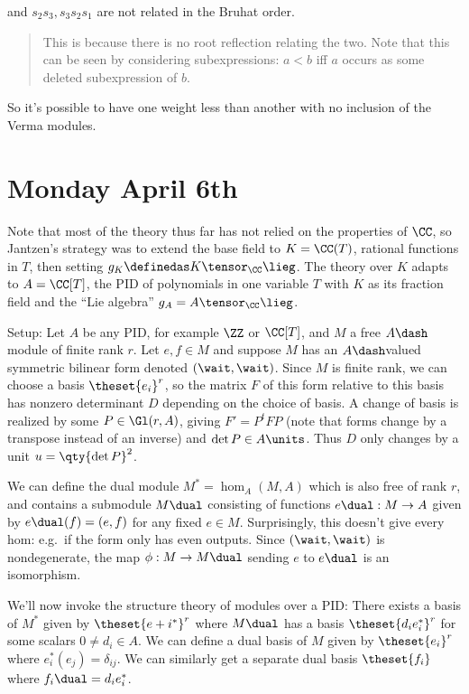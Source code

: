 and \(s_2 s_3, s_3 s_2 s_1\) are not related in the Bruhat order.

\begin{quote}
This is because there is no root reflection relating the two. Note that
this can be seen by considering subexpressions: \(a < b\) iff \(a\)
occurs as some deleted subexpression of \(b\).
\end{quote}

So it's possible to have one weight less than another with no inclusion
of the Verma modules.

\hypertarget{monday-april-6th}{%
\section{Monday April 6th}\label{monday-april-6th}}

Note that most of the theory thus far has not relied on the properties
of \(\CC\), so Jantzen's strategy was to extend the base field to
\(K = \CC(T)\), rational functions in \(T\), then setting
\(g_K \definedas K \tensor_\CC \lieg\). The theory over \(K\) adapts to
\(A = \CC[T]\), the PID of polynomials in one variable \(T\) with \(K\)
as its fraction field and the ``Lie algebra''
\(g_A = A \tensor_\CC \lieg\).

Setup: Let \(A\) be any PID, for example \(\ZZ\) or \(\CC[T]\), and
\(M\) a free \(A\dash\)module of finite rank \(r\). Let \(e, f\in M\)
and suppose \(M\) has an \(A\dash\)valued symmetric bilinear form
denoted \((\wait, \wait)\). Since \(M\) is finite rank, we can choose a
basis \(\theset{e_i}^r\), so the matrix \(F\) of this form relative to
this basis has nonzero determinant \(D\) depending on the choice of
basis. A change of basis is realized by some \(P \in \Gl(r, A)\), giving
\(F' = P^t F P\) (note that forms change by a transpose instead of an
inverse) and \(\det P \in A\units\). Thus \(D\) only changes by a unit
\(u = \qty{\det P}^2\).

We can define the dual module \(M^* = \hom_A(M, A)\) which is also free
of rank \(r\), and contains a submodule \(M\dual\) consisting of
functions \(e\dual: M \to A\) given by \(e\dual(f) = (e, f)\) for any
fixed \(e\in M\). Surprisingly, this doesn't give every hom: e.g.~if the
form only has even outputs. Since \((\wait, \wait)\) is nondegenerate,
the map \(\phi: M\to M\dual\) sending \(e\) to \(e\dual\) is an
isomorphism.

We'll now invoke the structure theory of modules over a PID: There
exists a basis of \(M^*\) given by \(\theset{e+i^*}^r\) where \(M\dual\)
has a basis \(\theset{d_i e_i^*}^r\) for some scalars
\(0\neq d_i \in A\). We can define a dual basis of \(M\) given by
\(\theset{e_i}^r\) where \(e_i^*(e_j) = \delta_{ij}\). We can similarly
get a separate dual basis \(\theset{f_i}\) where
\(f_i\dual = d_i e_i^*\).

